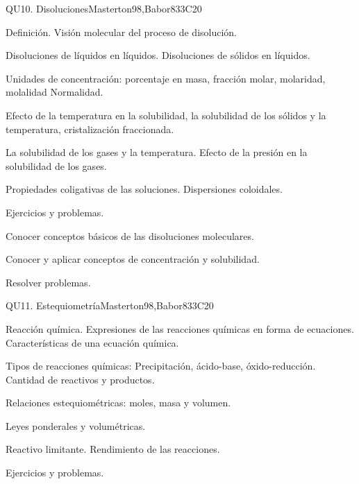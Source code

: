 \begin{syllabus}
\begin{unit}{QU10. Disoluciones}{}{Masterton98,Babor83}{3}{C20}
\begin{topics}
      \item Definición. Visión molecular del proceso de disolución.
      \item Disoluciones de líquidos en líquidos. Disoluciones de sólidos en líquidos.
      \item Unidades de concentración: porcentaje en masa, fracción molar, molaridad, molalidad Normalidad.
      \item Efecto de la temperatura en la solubilidad, la solubilidad de los sólidos y la temperatura, cristalización fraccionada.
      \item La solubilidad de los gases y la temperatura. Efecto  de la presión en la solubilidad de los gases.
      \item Propiedades coligativas de las soluciones. Dispersiones coloidales.
      \item Ejercicios y problemas.
    \end{topics}

   \begin{learningoutcomes}
      \item Conocer conceptos básicos de las disoluciones moleculares.
      \item Conocer y aplicar conceptos de concentración y solubilidad.
      \item Resolver problemas.
   \end{learningoutcomes}
\end{unit}

\begin{unit}{QU11. Estequiometría}{}{Masterton98,Babor83}{3}{C20}
\begin{topics}
      \item Reacción química. Expresiones de las reacciones químicas en forma de ecuaciones. Características de una ecuación química.
      \item Tipos de reacciones químicas: Precipitación, ácido-base, óxido-reducción. Cantidad de reactivos y productos.
      \item Relaciones estequiométricas: moles, masa y volumen.
      \item Leyes ponderales y volumétricas.
      \item Reactivo limitante. Rendimiento de las reacciones.
      \item Ejercicios y problemas.
    \end{topics}


\end{unit}
\end{syllabus}

